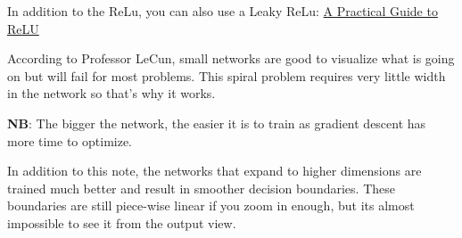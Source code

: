 \noindent{}

In addition to the ReLu, you can also use a Leaky ReLu: 
\href{https://medium.com/tinymind/a-practical-guide-to-relu-b83ca804f1f7}{A Practical Guide to ReLU}

According to Professor LeCun, small networks are good to visualize what is going on but will fail for most problems. 
This spiral problem requires very little width in the network so that's why it works. 

\textbf{NB}: The bigger the network, the easier it is to train as gradient descent has more time to optimize.

In addition to this note, the networks that expand to higher dimensions are trained much better and result in smoother decision boundaries. 
These boundaries are still piece-wise linear if you zoom in enough, but its almost impossible to see it from the output view. 